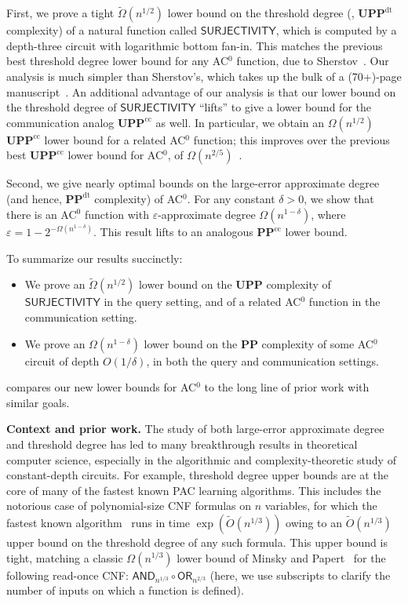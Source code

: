 \documentclass{toc}
\newcommand{\OR}{\mathsf{ OR}}
\newcommand{\PP}{\mathbf{PP}}
\newcommand{\UPP}{\mathbf{UPP}}
\newcommand{\eps}{\varepsilon}
\newcommand{\AND}{\mathsf{AND}}
\begin{document}
First, we prove a tight $\tilde{\Omega}(n^{1/2})$ lower bound
on the threshold degree (\ie,  $\UPP^{\text{dt}}$ complexity) of a natural function called $\mathsf{SURJECTIVITY}$,
which is computed by a depth-three %
circuit with logarithmic bottom fan-in.
This matches the previous best threshold degree lower bound for any AC$^0$
function, due to Sherstov~\cite{sherstov15}. Our analysis is 
much simpler than
Sherstov's, which takes up the bulk of a (70+)-page manuscript~\cite{sherstov15}.
%
An additional advantage of our analysis is that our lower bound on the threshold degree of $\mathsf{SURJECTIVITY}$ ``lifts'' to give a lower bound for the communication analog  $\UPP^{\text{cc}}$ as well.
In particular, we obtain an $\Omega(n^{1/2})$ 
$\UPP^{\text{cc}}$
lower bound for a related AC$^0$ function; this improves over the previous best $\UPP^{\text{cc}}$
lower bound for AC$^0$, of $\Omega(n^{2/5})$~\cite{bt16}. 

Second, we give nearly optimal bounds on the large-error approximate degree (and hence, $\PP^{\text{dt}}$ complexity) of AC$^0$. For any constant $\delta > 0$, we show that there is an AC$^0$ function with $\eps$-approximate degree
$\Omega(n^{1-\delta})$, where $\eps=1-2^{-\Omega(n^{1-\delta})}$. This result lifts to an analogous $\PP^{\text{cc}}$ lower bound. 

To summarize our results succinctly:
\begin{itemize}
	\item We prove an $\tilde{\Omega}(n^{1/2})$ lower bound on the $\UPP$ complexity of $\mathsf{SURJECTIVITY}$ in the query setting,
	and of a related AC$^0$ function in the communication setting.
	\item We prove an $\Omega(n^{1-\delta})$ lower bound on the $\PP$ complexity of some AC$^0$ circuit of depth $O(1/\delta)$, in both the query and communication settings.
\end{itemize}

 compares our new lower bounds for AC$^0$ to the long line of prior %
work   %
with similar goals.




\medskip \noindent \textbf{Context and prior work.}
The study of both large-error approximate degree and threshold degree
has led to many breakthrough results in theoretical computer science,
especially in the algorithmic and complexity-theoretic study of
constant-depth %
circuits.
For example, threshold degree upper bounds are at the core of many of the fastest known PAC learning algorithms.
This includes the notorious case of polynomial-size %
CNF formulas on $n$ variables, for which the fastest known algorithm~\cite{ksdnf} runs in time $\exp(\tilde{O}(n^{1/3}))$
owing to an $\tilde{O}(n^{1/3})$ upper bound on the threshold degree of any such formula. This upper bound \label{sec:MP}
is tight, matching a classic $\Omega(n^{1/3})$ lower bound of Minsky and Papert~\cite{mp} for the following read-once CNF:
$\AND_{n^{1/3}} \circ \OR_{n^{2/3}}$ (here, we use \label{s:footyfootfoot}
subscripts to clarify the number of inputs on which a function is defined). 
\end{document}

